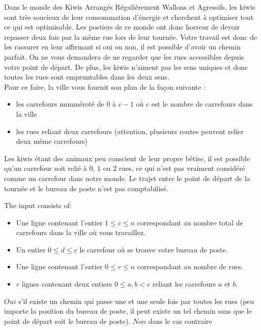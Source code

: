 

\newcommand{\maxa}{123456789}

Dans le monde des Kiwis Arrangés Régulièrement Wallons et Agressifs, les kiwis sont très soucieux de leur consommation d'énergie et cherchent à optimiser tout ce qui est optimisable. Les postiers de ce monde ont donc horreur de devoir repasser deux fois par la même rue lors de leur tournée. Votre travail est donc de les rassurer en leur affirmant si oui ou non, il est possible d'avoir un chemin parfait. On ne vous demandera de ne regarder que les rues accessibles depuis votre point de départ. De plus, les kiwis n'aiment pas les sens uniques et donc toutes les rues sont empruntables dans les deux sens. \\
Pour ce faire, la ville vous fournit son plan de la façon suivante :
\begin{itemize}
\item les carrefours numméroté de 0 à $c-1$ où $c$ est le nombre de carrefours dans la ville
\item les rues reliant deux carrefours (attention, plusieurs routes peuvent relier deux même carrefours)
\end{itemize}
Les kiwis étant des animaux peu conscient de leur propre bêtise, il est possible qu'un carrefour soit relié à $0$, $1$ ou $2$ rues, ce qui n'est pas vraiment considéré comme un carrefour dans notre monde.
Le trajet entre le point de départ de la tournée et le bureau de poste n'est pas comptabilisé. 
\begin{Input}
    The input consists of:
    \begin{itemize}
        \item Une ligne contenant l'entier $1 \leq c \leq n$ correspondant au nombre total de carrefours dans la ville où vous travaillez.
        \item Un entier $0\leq d \leq c$ le carrefour où se trouve votre bureau de poste.
        \item Une ligne contenant l'entier $0 \leq r \leq n$ correspondant au nombre de rues.
        \item $r$ lignes contenant deux entiers $0\leq a,b < c$ reliant les carrefours $a$ et $b$.
    \end{itemize}
\end{Input}

\begin{Output}
    $Oui$ s'il existe un chemin qui passe une et une seule fois par toutes les rues (peu importe la position du bureau de poste, il peut existe un tel chemin sans que le point de départ soit le bureau de poste). $Non$ dans le cas contraire
\end{Output}
